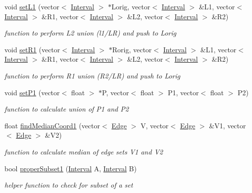 \begin{DoxyCompactItemize}
void \hyperlink{classisorect_a0c292396ca5de5692da4130819e1edba}{set\+L1} (vector$<$ \hyperlink{classInterval}{Interval} $>$ $\ast$Lorig, vector$<$ \hyperlink{classInterval}{Interval} $>$ \&L1, vector$<$ \hyperlink{classInterval}{Interval} $>$ \&R1, vector$<$ \hyperlink{classInterval}{Interval} $>$ \&L2, vector$<$ \hyperlink{classInterval}{Interval} $>$ \&R2)
\begin{DoxyCompactList}\small\item\em function to perform L2 union (l1/\+LR) and push to Lorig \end{DoxyCompactList}\item 
void \hyperlink{classisorect_af829250d2d043fde4d8356cb68076823}{set\+R1} (vector$<$ \hyperlink{classInterval}{Interval} $>$ $\ast$Rorig, vector$<$ \hyperlink{classInterval}{Interval} $>$ \&L1, vector$<$ \hyperlink{classInterval}{Interval} $>$ \&R1, vector$<$ \hyperlink{classInterval}{Interval} $>$ \&L2, vector$<$ \hyperlink{classInterval}{Interval} $>$ \&R2)
\begin{DoxyCompactList}\small\item\em function to perform R1 union (R2/\+LR) and push to Lorig \end{DoxyCompactList}\item 
void \hyperlink{classisorect_af3fb03a32b2c833d32ed610f0b260071}{set\+P1} (vector$<$ float $>$ $\ast$P, vector$<$ float $>$ P1, vector$<$ float $>$ P2)
\begin{DoxyCompactList}\small\item\em function to calculate union of P1 and P2 \end{DoxyCompactList}\item 
float \hyperlink{classisorect_a82bd808dcca448ce35645d2af0e13596}{find\+Median\+Coord1} (vector$<$ \hyperlink{classEdge}{Edge} $>$ V, vector$<$ \hyperlink{classEdge}{Edge} $>$ \&V1, vector$<$ \hyperlink{classEdge}{Edge} $>$ \&V2)
\begin{DoxyCompactList}\small\item\em function to calculate median of edge sets V1 and V2 \end{DoxyCompactList}\item 
bool \hyperlink{classisorect_a6382fc3ab9d83e36fcb572b1a615fd5f}{proper\+Subset1} (\hyperlink{classInterval}{Interval} A, \hyperlink{classInterval}{Interval} B)
\begin{DoxyCompactList}\small\item\em helper function to check for subset of a set \end{DoxyCompactList}\item 

\end{DoxyCompactItemize}
